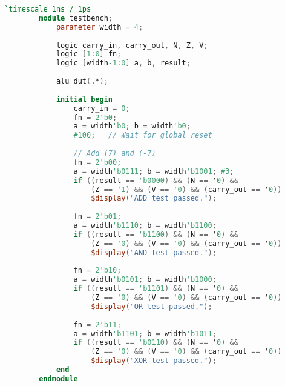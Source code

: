 \documentclass[a4paper, 12pt]{article}
\begin{document}
	\begin{mdframed}[backgroundcolor=code-gray, roundcorner=10pt,
								innerleftmargin=5, innertopmargin=5, innerbottommargin=5]	
	\begin{lstlisting}[language=Verilog, caption=ALU Testbench, tabsize=2, label={lst:init-hardware}]
		`timescale 1ns / 1ps
		module testbench;
			parameter width = 4;		
		
			logic carry_in, carry_out, N, Z, V;
			logic [1:0] fn;
			logic [width-1:0] a, b, result;
			
			alu dut(.*);
			
			initial begin
				carry_in = 0;
				fn = 2'b0;
				a = width'b0; b = width'b0;
				#100;	// Wait for global reset
				
				// Add (7) and (-7)
				fn = 2'b00;
				a = width'b0111; b = width'b1001; #3;
				if ((result == 'b0000) && (N == '0) &&
					(Z == '1) && (V == '0) && (carry_out == '0))
					$display("ADD test passed.");
					
				fn = 2'b01;
				a = width'b1110; b = width'b1100;
				if ((result == 'b1100) && (N == '0) && 
					(Z == '0) && (V == '0) && (carry_out == '0))
					$display("AND test passed.");
					
				fn = 2'b10;
				a = width'b0101; b = width'b1000;
				if ((result == 'b1101) && (N == '0) && 
					(Z == '0) && (V == '0) && (carry_out == '0))
					$display("OR test passed.");
					
				fn = 2'b11;
				a = width'b1101; b = width'b1011;
				if ((result == 'b0110) && (N == '0) && 
					(Z == '0) && (V == '0) && (carry_out == '0))
					$display("XOR test passed.");
			end
		endmodule
	\end{lstlisting}
	\end{mdframed}
\end{document}
